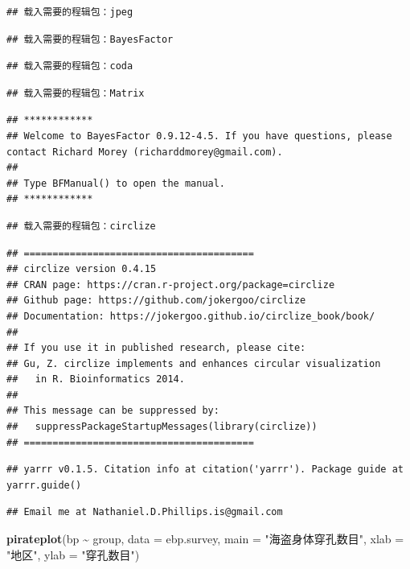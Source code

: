 \documentclass[
  hyperref,]{ctexart}
\newenvironment{Shaded}{\begin{snugshade}}{\end{snugshade}}
\newcommand{\AttributeTok}[1]{\textcolor[rgb]{0.13,0.29,0.53}{#1}}
\newcommand{\FunctionTok}[1]{\textcolor[rgb]{0.13,0.29,0.53}{\textbf{#1}}}
\newcommand{\NormalTok}[1]{#1}
\newcommand{\SpecialCharTok}[1]{\textcolor[rgb]{0.81,0.36,0.00}{\textbf{#1}}}
\newcommand{\StringTok}[1]{\textcolor[rgb]{0.31,0.60,0.02}{#1}}
\begin{document}
\begin{verbatim}
## 载入需要的程辑包：jpeg
\end{verbatim}

\begin{verbatim}
## 载入需要的程辑包：BayesFactor
\end{verbatim}

\begin{verbatim}
## 载入需要的程辑包：coda
\end{verbatim}

\begin{verbatim}
## 载入需要的程辑包：Matrix
\end{verbatim}

\begin{verbatim}
## ************
## Welcome to BayesFactor 0.9.12-4.5. If you have questions, please contact Richard Morey (richarddmorey@gmail.com).
## 
## Type BFManual() to open the manual.
## ************
\end{verbatim}

\begin{verbatim}
## 载入需要的程辑包：circlize
\end{verbatim}

\begin{verbatim}
## ========================================
## circlize version 0.4.15
## CRAN page: https://cran.r-project.org/package=circlize
## Github page: https://github.com/jokergoo/circlize
## Documentation: https://jokergoo.github.io/circlize_book/book/
## 
## If you use it in published research, please cite:
## Gu, Z. circlize implements and enhances circular visualization
##   in R. Bioinformatics 2014.
## 
## This message can be suppressed by:
##   suppressPackageStartupMessages(library(circlize))
## ========================================
\end{verbatim}

\begin{verbatim}
## yarrr v0.1.5. Citation info at citation('yarrr'). Package guide at yarrr.guide()
\end{verbatim}

\begin{verbatim}
## Email me at Nathaniel.D.Phillips.is@gmail.com
\end{verbatim}

\begin{Shaded}
\begin{Highlighting}[]
\FunctionTok{pirateplot}\NormalTok{(bp }\SpecialCharTok{\textasciitilde{}}\NormalTok{ group, }\AttributeTok{data =}\NormalTok{ ebp.survey, }\AttributeTok{main =} \StringTok{"海盗身体穿孔数目"}\NormalTok{, }\AttributeTok{xlab =} \StringTok{"地区"}\NormalTok{, }\AttributeTok{ylab =} \StringTok{"穿孔数目"}\NormalTok{)}
\end{Highlighting}
\end{Shaded}
\end{document}
